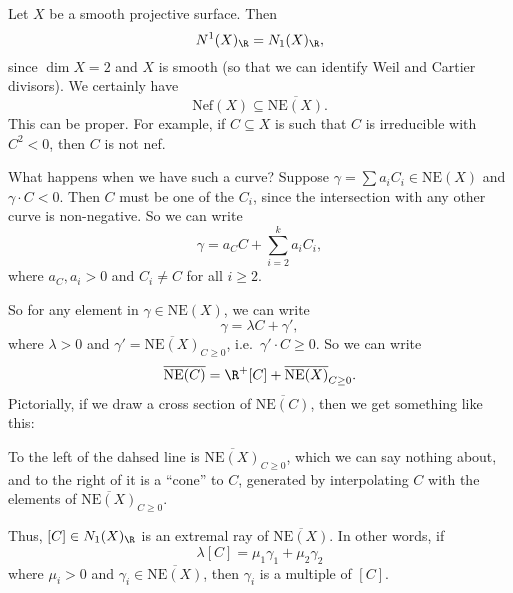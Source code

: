 \documentclass[a4paper]{article}
\newcommand\Nef{\mathrm{Nef}}
\newcommand\NE{\mathrm{NE}}
\begin{document}
\begin{eg}
  Let $X$ be a smooth projective surface. Then
  \[
    N^1(X)_\R = N_1(X)_\R,
  \]
  since $\dim X = 2$ and $X$ is smooth (so that we can identify Weil and Cartier divisors). We certainly have
  \[
    \Nef(X) \subseteq \overline{\NE(X)}.
  \]
  This can be proper. For example, if $C \subseteq X$ is such that $C$ is irreducible with $C^2 < 0$, then $C$ is not nef.

  What happens when we have such a curve? Suppose $\gamma = \sum a_i C_i \in \NE(X)$ and $\gamma \cdot C < 0$. Then $C$ must be one of the $C_i$, since the intersection with any other curve is non-negative. So we can write
  \[
    \gamma = a_C C + \sum_{i = 2}^k a_i C_i,
  \]
  where $a_C, a_i > 0$ and $C_i \not= C$ for all $i \geq 2$.

  So for any element in $\gamma \in \NE(X)$, we can write
  \[
    \gamma = \lambda C + \gamma',
  \]
  where $\lambda > 0$ and $\gamma' = \overline{\NE(X)}_{C \geq 0}$, i.e.\ $\gamma' \cdot C \geq 0$. So we can write
  \[
    \overline{\NE(C)} = \R^+[C] + \overline{\NE(X)}_{C \geq 0}.
  \]
  Pictorially, if we draw a cross section of $\overline{\NE(C)}$, then we get something like this:
  \begin{center}
  \end{center}
  To the left of the dahsed line is $\overline{\NE(X)}_{C \geq 0}$, which we can say nothing about, and to the right of it is a ``cone'' to $C$, generated by interpolating $C$ with the elements of $\overline{\NE(X)}_{C \geq 0}$.

  Thus, $[C] \in N_1(X)_\R$ is an extremal ray of $\overline{\NE(X)}$. In other words, if
  \[
    \lambda [C] = \mu_1 \gamma_1 + \mu_2 \gamma_2
  \]
  where $\mu_i > 0$ and $\gamma_i \in \overline{\NE(X)}$, then $\gamma_i$ is a multiple of $[C]$.
\end{eg}
\end{document}
